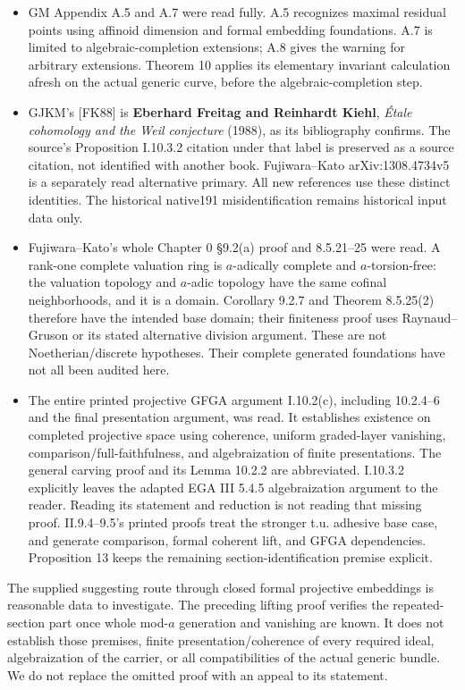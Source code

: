\documentclass[
  11pt,
]{article}
\begin{document}
\begin{itemize}
  algebraic domain.
\item
  GM Appendix A.5 and A.7 were read fully. A.5 recognizes maximal
  residual points using affinoid dimension and formal embedding
  foundations. A.7 is limited to algebraic-completion extensions; A.8
  gives the warning for arbitrary extensions. Theorem 10 applies its
  elementary invariant calculation afresh on the actual generic curve,
  before the algebraic-completion step.
\item
  GJKM's {[}FK88{]} is \textbf{Eberhard Freitag and Reinhardt Kiehl},
  \emph{Étale cohomology and the Weil conjecture} (1988), as its
  bibliography confirms. The source's Proposition I.10.3.2 citation
  under that label is preserved as a source citation, not identified
  with another book. Fujiwara--Kato arXiv:1308.4734v5 is a separately
  read alternative primary. All new references use these distinct
  identities. The historical native191 misidentification remains
  historical input data only.
\item
  Fujiwara--Kato's whole Chapter 0 §9.2(a) proof and 8.5.21--25 were
  read. A rank-one complete valuation ring is \(a\)-adically complete
  and \(a\)-torsion-free: the valuation topology and \(a\)-adic topology
  have the same cofinal neighborhoods, and it is a domain. Corollary
  9.2.7 and Theorem 8.5.25(2) therefore have the intended base domain;
  their finiteness proof uses Raynaud--Gruson or its stated alternative
  division argument. These are not Noetherian/discrete hypotheses. Their
  complete generated foundations have not all been audited here.
\item
  The entire printed projective GFGA argument I.10.2(c), including
  10.2.4--6 and the final presentation argument, was read. It
  establishes existence on completed projective space using coherence,
  uniform graded-layer vanishing, comparison/full-faithfulness, and
  algebraization of finite presentations. The general carving proof and
  its Lemma 10.2.2 are abbreviated. I.10.3.2 explicitly leaves the
  adapted EGA III 5.4.5 algebraization argument to the reader. Reading
  its statement and reduction is not reading that missing proof.
  II.9.4--9.5's printed proofs treat the stronger t.u. adhesive base
  case, and generate comparison, formal coherent lift, and GFGA
  dependencies. Proposition 13 keeps the remaining
  section-identification premise explicit.
\end{itemize}

The supplied suggesting route through closed formal projective
embeddings is reasonable data to investigate. The preceding lifting
proof verifies the repeated-section part once whole mod-\(a\) generation
and vanishing are known. It does not establish those premises, finite
presentation/coherence of every required ideal, algebraization of the
carrier, or all compatibilities of the actual generic bundle. We do not
replace the omitted proof with an appeal to its statement.
\end{document}
